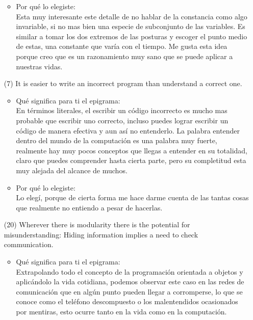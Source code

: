 \documentclass{article}
\begin{document}
\begin{itemize}
\begin{itemize}
        \item Por qué lo elegiste:\\
        Esta muy interesante este detalle de no hablar de la constancia como algo invariable, si no mas bien una especie de subconjunto de las variables. Es similar a tomar los dos extremos de las posturas y escoger el punto medio de estas, una constante que varía con el tiempo. Me gusta esta idea porque creo que es un razonamiento muy sano que se puede aplicar a nuestras vidas.
    \end{itemize}
    \item[(7)]It is easier to write an incorrect program than understand a correct one.
    \begin{itemize}
        \item Qué significa para ti el epigrama:\\
        En términos literales, el escribir un código incorrecto es mucho mas probable que escribir uno correcto, incluso puedes lograr escribir un código de manera efectiva y aun así no entenderlo. La palabra entender dentro del mundo de la computación es una palabra muy fuerte, realmente hay muy pocos conceptos que llegas a entender en su totalidad, claro que puedes comprender hasta cierta parte, pero su completitud esta muy alejada del alcance de muchos.
        \item Por qué lo elegiste:\\
        Lo elegí, porque de cierta forma me hace darme cuenta de las tantas cosas que realmente no entiendo a pesar de hacerlas.
    \end{itemize}
    \item[(20)]Wherever there is modularity there is the potential for misunderstanding: Hiding information implies a need to check communication.
    \begin{itemize}
        \item Qué significa para ti el epigrama:\\
        Extrapolando todo el concepto de la programación orientada a objetos y aplicándolo la vida cotidiana, podemos observar este caso en las redes de comunicación que en algún punto pueden llegar a corromperse, lo que se conoce como el teléfono descompuesto o los malentendidos ocasionados por mentiras, esto ocurre tanto en la vida como en la computación.

\end{itemize}
\end{itemize}
\end{document}
